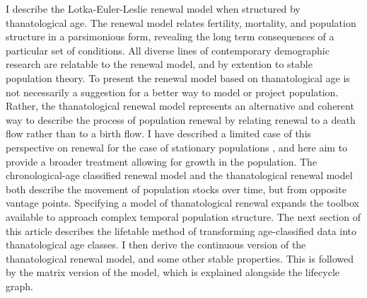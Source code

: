 \documentclass{article}
\begin{document}
I describe the Lotka-Euler-Leslie renewal model when structured by
thanatological age. The renewal model relates
fertility, mortality, and population structure in a parsimonious form, revealing the long term consequences of a particular set of conditions. All diverse lines of contemporary demographic research are relatable to the renewal model, and by extention to stable population theory.
To present the renewal model based on thanatological age is not necessarily a
suggestion for a better way to model or project population. Rather, the
thanatological renewal model represents an alternative and coherent way to
describe the process of population renewal by relating renewal to a death flow
rather than to a birth flow. I have described a limited case of this
perspective on renewal for the case of stationary populations
\citep{riffe2015force}, and here aim to provide a broader treatment allowing for
growth in the population.
The chronological-age classified renewal model and the thanatological renewal model both describe the movement of population stocks over time, but from opposite vantage points. Specifying a model of thanatological renewal expands the toolbox available to approach complex
temporal population structure. The next section of this article describes the lifetable method of transforming age-classified
data into thanatological age classes. I then derive the continuous version of
the thanatological renewal model, and some other stable properties. This is
followed by the matrix version of the model, which is explained alongside the
lifecycle graph. 
\end{document}
